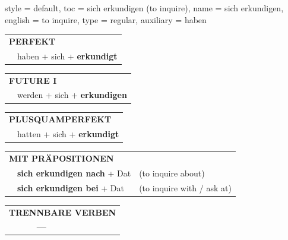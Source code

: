 \begin{verbentry}{
  style = {default},
  toc = {sich erkundigen (to inquire)},
  name = {sich erkundigen},
  english = {to inquire},
  type = {regular},
  auxiliary = {haben}
}
 \begin{tabular}{rl}
     \multicolumn{2}{l}{\textbf{PERFEKT}}\\
   & haben + sich + \textbf{erkundigt}\\
  \end{tabular}
\hfill
   \begin{tabular}{rl}
    \multicolumn{2}{l}{\textbf{FUTURE I} }\\
   & werden + sich + \textbf{erkundigen}\\
  \end{tabular}
\hfill
   \begin{tabular}{rl}
      \multicolumn{2}{l}{\textbf{PLUSQUAMPERFEKT}}\\
   & hatten + sich + \textbf{erkundigt}\\
  \end{tabular}

   \vspace{10pt}

   \begin{tabular}{lll}
      \multicolumn{3}{l}{\textbf{MIT PRÄPOSITIONEN}}\\
& \textbf{sich erkundigen nach} + Dat & (to inquire about)\\
& \textbf{sich erkundigen bei} + Dat & (to inquire with / ask at)\\
\end{tabular}
  \hfill
   \begin{tabular}{lll}
\multicolumn{3}{l}{\textbf{TRENNBARE VERBEN}}\\
& \textbf{---} & \\
\end{tabular}

  \vspace{-5pt}
\end{verbentry}

